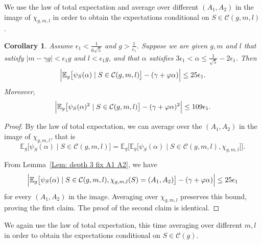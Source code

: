 \documentclass[12pt]{amsart}
\def\E{{\mathbb E}}
\renewcommand{\phi}{\varphi}
\newcommand{\cC}{\mathcal{C}}
\newtheorem{corollary}[theorem]{Corollary}
\begin{document}
We use the law of total expectation and average over different $(A_1,A_2)$ in the image of $\chi_{g,m,l}$ in order to obtain the expectations conditional on $S\in\cC(g,m,l)$.


\begin{corollary}\label{Cor: depth 3 fix gml}
Assume $\epsilon_1< \frac{1}{6\sqrt{5}}$ and $g>\frac{1}{\epsilon_1}$.
Suppose we are given $g,m$ and $l$ that satisfy $|m-\gamma g|<\epsilon_1 g$ and $l<\epsilon_1 g$, and that $\alpha$ satisfies $3\epsilon_1< \alpha \leq \frac{1}{\sqrt{5}} -2\epsilon_1$.
Then
\[
\Bigl|\E_g \big[\psi_S(\alpha)\mid S\in \cC(g,m,l) \big]-(\gamma+\phi\alpha)\Bigr|
\leq 25\epsilon_1. 
\]
Moreover,
\[
\Bigl|\E_g \big[\psi_S(\alpha)^2\mid S\in \cC(g,m,l) \big]-(\gamma+\phi\alpha)^2\Bigr|
\leq 109\epsilon_1. 
\]
\end{corollary}
\begin{proof}
By the law of total expectation, we can average over the $(A_1,A_2)$ in the image of $\chi_{g,m,l}$, that is
\[
\E_g\big[\psi_S(\alpha)\mid S\in \cC(g,m,l)\big]
=\E_g\big[\E_g\big[\psi_S(\alpha)\mid S\in \cC(g,m,l),\chi_{g,m,l}\big]\big].
\]

From Lemma~\ref{Lem: depth 3 fix A1 A2}, we have
\[
\Bigl|\E_g \big[\psi_S(\alpha)\mid S\in \cC(g,m,l),\chi_{g,m,l}(S)=(A_1,A_2)\big]
-(\gamma+\phi\alpha)\Bigr|\leq 25\epsilon_1
\]
for every $(A_1,A_2)$ in the image. Averaging over $\chi_{g,m,l}$ preserves
this bound, proving the first claim. The proof of the second claim is identical.
\end{proof}

We again use the law of total expectation, this time averaging over different $m,l$ in order to obtain the expectations conditional on $S\in\cC(g)$.
\end{document}
